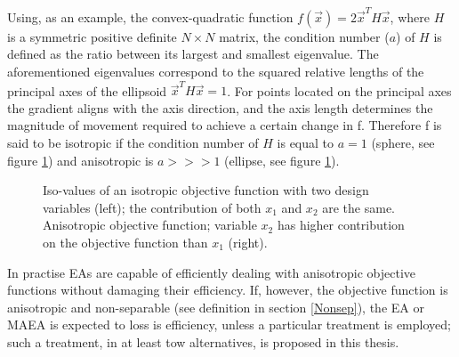 Using, as an example, the convex-quadratic function $f(\vec{x}) = 2\vec{x}^TH\vec{x}$, where $H$ is a symmetric positive definite $N \times N$ matrix, the condition number ($a$) of $H$ is defined as the ratio between its largest and smallest eigenvalue. The aforementioned eigenvalues correspond to the squared relative lengths of the principal axes of the ellipsoid $\vec{x}^TH\vec{x} = 1$. For points located on the principal axes the gradient aligns with the axis direction, and the axis length determines the magnitude of movement required to achieve a certain change in f. Therefore f is said to be isotropic if the condition number of $H$ is equal to $a=1$ (sphere, see figure \ref{illc}) and anisotropic is $a>>>1$ (ellipse, see figure \ref{illc}).

  


\begin{figure}[h!]
\begin{minipage}[b]{1.0\linewidth}
 \centering
\end{minipage}
\caption{Iso-values of an isotropic objective function with two design variables (left); the contribution of both $x_1$ and $x_2$ are the same. Anisotropic objective function; variable $x_2$ has higher contribution on the objective function than $x_1$ (right).} 
\label{illc}
\end{figure}

In practise EAs are capable of efficiently dealing with anisotropic objective functions without damaging their efficiency. If, however, the objective function is anisotropic and non-separable (see definition in section \ref{Nonsep}), the EA or MAEA is expected to loss is efficiency, unless a particular treatment is employed; such a treatment, in at least tow alternatives, is proposed in this thesis.  

